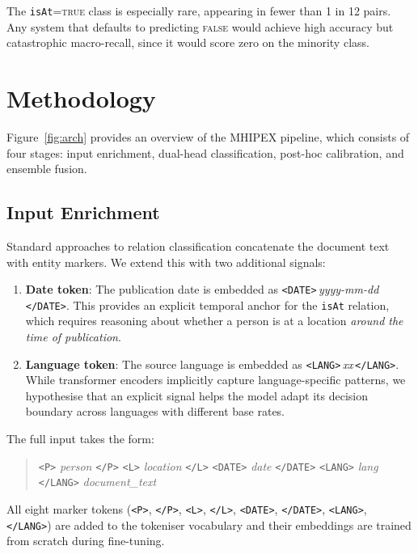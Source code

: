 \documentclass[runningheads]{llncs}
\begin{document}
The \texttt{isAt}=\textsc{true} class is especially rare, appearing in fewer than 1 in 12 pairs. Any system that defaults to predicting \textsc{false} would achieve high accuracy but catastrophic macro-recall, since it would score zero on the minority class.

\section{Methodology}
\label{sec:method}

Figure~\ref{fig:arch} provides an overview of the MHIPEX pipeline, which consists of four stages: input enrichment, dual-head classification, post-hoc calibration, and ensemble fusion.

\subsection{Input Enrichment}
\label{sec:enrichment}

Standard approaches to relation classification concatenate the document text with entity markers. We extend this with two additional signals:

\begin{enumerate}
    \item \textbf{Date token}: The publication date is embedded as \texttt{<DATE>}\,\textit{yyyy-mm-dd}\,\texttt{</DATE>}. This provides an explicit temporal anchor for the \texttt{isAt} relation, which requires reasoning about whether a person is at a location \emph{around the time of publication}.
    \item \textbf{Language token}: The source language is embedded as \texttt{<LANG>}\,\textit{xx}\,\texttt{</LANG>}. While transformer encoders implicitly capture language-specific patterns, we hypothesise that an explicit signal helps the model adapt its decision boundary across languages with different base rates.
\end{enumerate}

The full input takes the form:
\begin{quote}
\texttt{<P>} \textit{person} \texttt{</P>} \texttt{<L>} \textit{location} \texttt{</L>} \texttt{<DATE>} \textit{date} \texttt{</DATE>} \texttt{<LANG>} \textit{lang} \texttt{</LANG>} \textit{document\_text}
\end{quote}

All eight marker tokens (\texttt{<P>}, \texttt{</P>}, \texttt{<L>}, \texttt{</L>}, \texttt{<DATE>}, \texttt{</DATE>}, \texttt{<LANG>}, \texttt{</LANG>}) are added to the tokeniser vocabulary and their embeddings are trained from scratch during fine-tuning.
\end{document}
